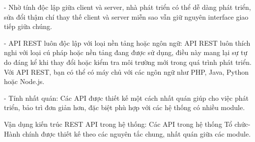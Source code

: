 - Nhờ tính độc lập giữa client và server, nhà phát triển có thể dễ dàng phát triển, sửa đổi thậm chí thay thế client và server miễn sao vẫn giữ nguyên interface giao tiếp giữa chúng.

- API REST luôn độc lập với loại nền tảng hoặc ngôn ngữ: API REST luôn thích nghi với loại cú pháp hoặc nền tảng đang được sử dụng, điều này mang lại sự tự do đáng kể khi thay đổi hoặc kiểm tra môi trường mới trong quá trình phát triển. Với API REST, bạn có thể có máy chủ với các ngôn ngữ như PHP, Java, Python hoặc Node.js.

- Tính nhất quán: Các API được thiết kế một cách nhất quán giúp cho việc phát triển, bảo trì đơn giản hơn, đặc biệt phù hợp với các hệ thống có nhiều module.

Vận dụng kiến trúc REST API trong hệ thống:
Các API trong hệ thống Tổ chức-Hành chính được thiết kế theo các nguyên tắc chung, nhất quán giữa các module.
